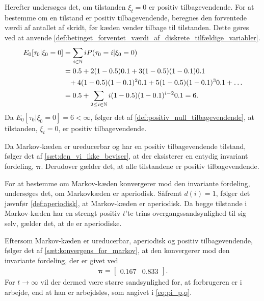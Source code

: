 Herefter undersøges det, om tilstanden $\xi_t = 0$ er positiv tilbagevendende. For at bestemme om en tilstand er positiv tilbagevendende, beregnes den forventede værdi af antallet af skridt, før kæden vender tilbage til tilstanden. Dette gøres ved at anvende \autoref{def:betinget_forventet_værdi_af_diskrete_tilfældige_variabler}.
 \begin{align*}
     E_0[\tau_{0}|\xi_0=0]&=\sum_{i\in \mathbb{N}} iP(\tau_{0}=i|\xi_0=0)\\
     &=0.5+2(1-0.5)0.1+3(1-0.5)(1-0.1)0.1\\
     &\phantom{=} +4(1-0.5)(1-0.1)^20.1+5(1-0.5)(1-0.1)^30.1+\ldots\\
     &=0.5 + \sum_{2\leq i \in \mathbb{N} } i(1-0.5)(1-0.1)^{i-2}0.1 = 6.
 \end{align*}
Da $E_0[\tau_{0}|\xi_0=0]=6<\infty$, følger det af \autoref{def:positiv_null_tilbagevendende}, at tilstanden, $\xi_t = 0$, er positiv tilbagevendende.

Da Markov-kæden er ureducerbar og har en positiv tilbagevendende tilstand, følger det af \autoref{sæt:den_vi_ikke_beviser}, at der eksisterer en entydig invariant fordeling, $\bm \pi$.
Derudover gælder det, at alle tilstandene er positiv tilbagevendende.


For at bestemme om Markov-kæden konvergerer mod den invariante fordeling, undersøges det, om Markovkæden er aperiodisk. Såfremt $d(i)=1$, følger det jævnfør \autoref{def:aperiodisk}, at Markov-kæden er aperiodisk. Da begge tilstande i Markov-kæden har en strengt positiv $t$'te trins overgangssandsynlighed til sig selv, gælder det, at de er aperiodiske. 

Eftersom Markov-kæden er ureducerbar, aperiodisk og positiv tilbagevendende, følger det af \autoref{sæt:konvergens_for_markov}, at den konvergerer mod den invariante fordeling, der er givet ved 
\begin{align}\label{eq:pi_p,q}
    \bm \pi = \begin{bmatrix} 0.167 & 0.833\end{bmatrix}.
\end{align}
For $t \to \infty$ vil der dermed være større sandsynlighed for, at forbrugeren er i arbejde, end at han er arbejdsløs, som angivet i \eqref{eq:pi_p,q}. 

